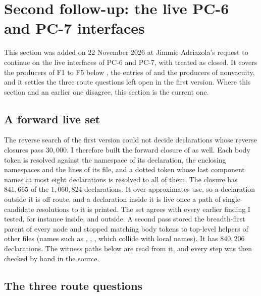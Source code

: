 \documentclass[11pt]{article}
\newcommand{\PC}[1]{\textsf{PC-#1}}
\theoremstyle{remark}
\begin{document}
\section{Second follow-up: the live \PC{6} and \PC{7} interfaces}\label{sec:fu2}

This section was added on 22 November 2026 at Jimmie Adriazola's request to continue on the live interfaces of \PC{6} and \PC{7}, with  treated as closed. It covers the producers of F1 to F5 below , the entries of  and the producers of nonvacuity, and it settles the three route questions left open in the first version. Where this section and an earlier one disagree, this section is the current one.

\subsection{A forward live set}\label{sec:fwd}

The reverse search of the first version could not decide declarations whose reverse closures pass $30{,}000$. I therefore built the forward closure of  as well. Each body token is resolved against the namespace of its declaration, the enclosing namespaces and the  lines of its file, and a dotted token whose last component names at most eight declarations is resolved to all of them. The closure has $841{,}665$ of the $1{,}060{,}824$ declarations. It over-approximates use, so a declaration outside it is off route, and a declaration inside it is live once a path of single-candidate resolutions to it is printed. The set agrees with every earlier finding I tested, for instance  inside,  and  outside. A second pass stored the breadth-first parent of every node and stopped matching body tokens to top-level helpers of other files (names such as , , , which collide with local names). It has $840{,}206$ declarations. The witness paths below are read from it, and every step was then checked by hand in the source.

\subsection{The three route questions}\label{sec:three}
\end{document}
